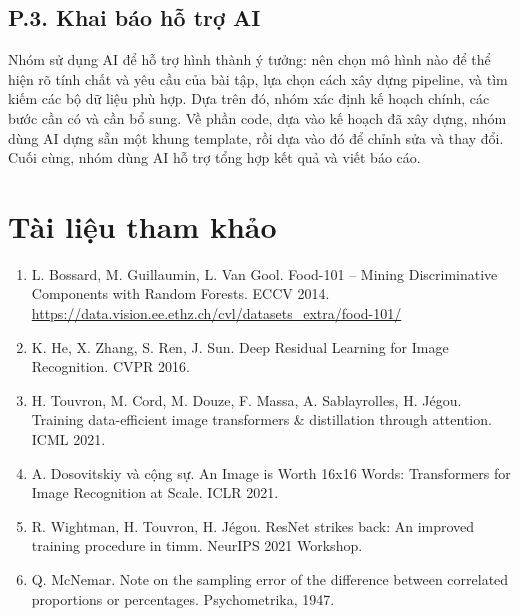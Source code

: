 \documentclass[12pt,a4paper]{article}
\begin{document}
\subsection*{P.3. Khai báo hỗ trợ AI}

Nhóm sử dụng AI để hỗ trợ hình thành ý tưởng: nên chọn mô hình nào để thể hiện rõ
tính chất và yêu cầu của bài tập, lựa chọn cách xây dựng pipeline, và tìm kiếm các
bộ dữ liệu phù hợp. Dựa trên đó, nhóm xác định kế hoạch chính, các bước cần có và
cần bổ sung. Về phần code, dựa vào kế hoạch đã xây dựng, nhóm dùng AI dựng sẵn một
khung template, rồi dựa vào đó để chỉnh sửa và thay đổi. Cuối cùng, nhóm dùng AI hỗ
trợ tổng hợp kết quả và viết báo cáo.

\section*{Tài liệu tham khảo}

\begin{enumerate}
\item[{[1]}] L. Bossard, M. Guillaumin, L. Van Gool. Food-101 -- Mining Discriminative
Components with Random Forests. ECCV 2014.
\url{https://data.vision.ee.ethz.ch/cvl/datasets_extra/food-101/}
\item[{[2]}] K. He, X. Zhang, S. Ren, J. Sun. Deep Residual Learning for Image
Recognition. CVPR 2016.
\item[{[3]}] H. Touvron, M. Cord, M. Douze, F. Massa, A. Sablayrolles, H. Jégou.
Training data-efficient image transformers \& distillation through attention. ICML
2021.
\item[{[4]}] A. Dosovitskiy và cộng sự. An Image is Worth 16x16 Words: Transformers for
Image Recognition at Scale. ICLR 2021.
\item[{[5]}] R. Wightman, H. Touvron, H. Jégou. ResNet strikes back: An improved training
procedure in timm. NeurIPS 2021 Workshop.
\item[{[6]}] Q. McNemar. Note on the sampling error of the difference between correlated
proportions or percentages. Psychometrika, 1947.
\end{enumerate}
\end{document}
